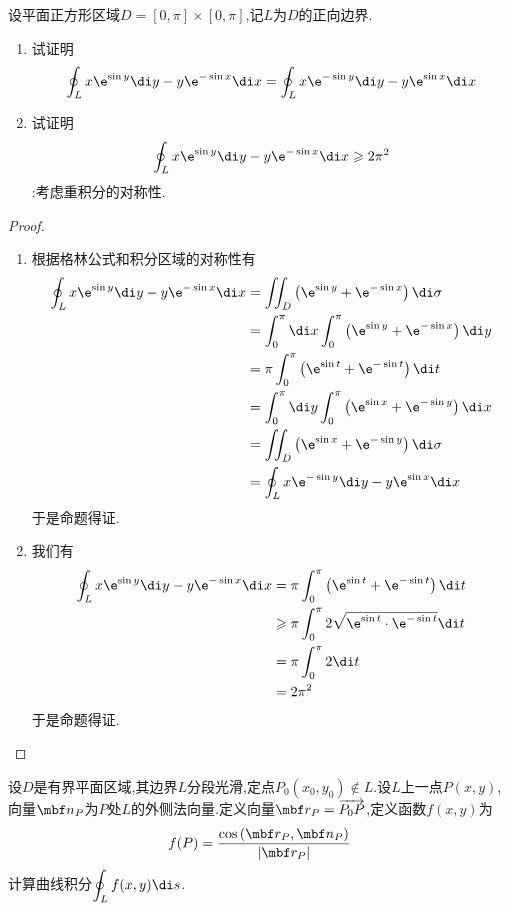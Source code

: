 \documentclass{ctexart}
\begin{document}
\begin{problem}[L.5.5]
    设平面正方形区域$D=[0,\pi]\times[0,\pi]$,记$L$为$D$的正向边界.
    \begin{enumerate}[label=\tbf{(\arabic*)}]
        \item 试证明
            \[\oint_Lx\e^{\sin y}\di y-y\e^{-\sin x}\di x=\oint_Lx\e^{-\sin y}\di y-y\e^{\sin x}\di x\]
        \item 试证明
            \[\oint_Lx\e^{\sin y}\di y-y\e^{-\sin x}\di x\geqslant2\pi^2\]
            :考虑重积分的对称性.
    \end{enumerate}
\end{problem}
\begin{proof}
    \begin{enumerate}[label=\tbf{(\arabic*)}]
        \item 根据格林公式和积分区域的对称性有
            \[\begin{aligned}
                \oint_Lx\e^{\sin y}\di y-y\e^{-\sin x}\di x
                &= \iint_D\left(\e^{\sin y}+\e^{-\sin x}\right)\di\sigma \\
                &= \int_0^\pi\di x\int_0^\pi\left(\e^{\sin y}+\e^{-\sin x}\right)\di y \\
                &= \pi\int_0^{\pi}\left(\e^{\sin t}+\e^{-\sin t}\right)\di t \\
                &= \int_0^\pi\di y\int_0^\pi\left(\e^{\sin x}+\e^{-\sin y}\right)\di x \\
                &= \iint_D\left(\e^{\sin x}+\e^{-\sin y}\right)\di\sigma \\
                &= \oint_Lx\e^{-\sin y}\di y-y\e^{\sin x}\di x
            \end{aligned}\]
            于是命题得证.
        \item 我们有
            \[\begin{aligned}
                \oint_Lx\e^{\sin y}\di y-y\e^{-\sin x}\di x
                &= \pi\int_0^{\pi}\left(\e^{\sin t}+\e^{-\sin t}\right)\di t \\
                &\geqslant \pi\int_0^\pi2\sqrt{\e^{\sin t}\cdot\e^{-\sin t}}\di t \\
                &= \pi\int_0^\pi2\di t\\
                &= 2\pi^2
            \end{aligned}\]
            于是命题得证.
    \end{enumerate}
\end{proof}
\begin{problem}[L.5.6]
    设$D$是有界平面区域,其边界$L$分段光滑,定点$P_0(x_0,y_0)\notin L$.设$L$上一点$P(x,y)$,%
    向量${\mbf n}_P$为$P$处$L$的外侧法向量.定义向量$\mbf r_P=\overrightarrow{P_0P}$,定义函数$f(x,y)$为
    \[f(P)=\dfrac{\cos\left(\mbf r_P,\mbf n_P\right)}{|\mbf r_P|}\]
    计算曲线积分$\displaystyle\oint_{L}f(x,y)\di s$.
\end{problem}
\end{document}
